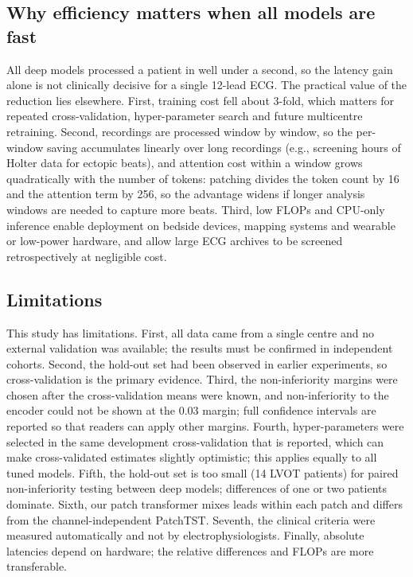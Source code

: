 \documentclass[preprint,12pt]{elsarticle}
\begin{document}
\subsection{Why efficiency matters when all models are fast}
All deep models processed a patient in well under a second, so the latency gain alone is not clinically decisive for a single 12-lead ECG. The practical value of the reduction lies elsewhere. First, training cost fell about 3-fold, which matters for repeated cross-validation, hyper-parameter search and future multicentre retraining. Second, recordings are processed window by window, so the per-window saving accumulates linearly over long recordings (e.g., screening hours of Holter data for ectopic beats), and attention cost within a window grows quadratically with the number of tokens: patching divides the token count by 16 and the attention term by 256, so the advantage widens if longer analysis windows are needed to capture more beats. Third, low FLOPs and CPU-only inference enable deployment on bedside devices, mapping systems and wearable or low-power hardware, and allow large ECG archives to be screened retrospectively at negligible cost.

\subsection{Limitations}
This study has limitations. First, all data came from a single centre and no external validation was available; the results must be confirmed in independent cohorts. Second, the hold-out set had been observed in earlier experiments, so cross-validation is the primary evidence. Third, the non-inferiority margins were chosen after the cross-validation means were known, and non-inferiority to the encoder could not be shown at the 0.03 margin; full confidence intervals are reported so that readers can apply other margins. Fourth, hyper-parameters were selected in the same development cross-validation that is reported, which can make cross-validated estimates slightly optimistic; this applies equally to all tuned models. Fifth, the hold-out set is too small (14 LVOT patients) for paired non-inferiority testing between deep models; differences of one or two patients dominate. Sixth, our patch transformer mixes leads within each patch and differs from the channel-independent PatchTST. Seventh, the clinical criteria were measured automatically and not by electrophysiologists. Finally, absolute latencies depend on hardware; the relative differences and FLOPs are more transferable.
\end{document}
